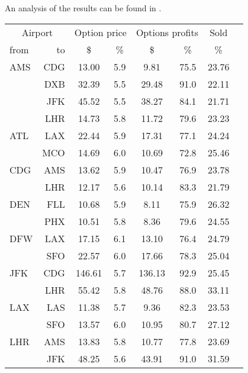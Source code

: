 An analysis of the results can be found in .
\\[2em]
\begin{table}[h]
    \begin{center}
        \begin{tabular}{l r c c c c c c}
            \toprule
            \multicolumn{2}{c}{Airport}  & \multicolumn{2}{c}{Option price} & \multicolumn{2}{c}{Options profits}  &  Sold  \\[.4ex]
            from  &  to  &  \$  & \%  &  \$  & \%  & \%  \\
            \midrule
AMS  &  CDG &   13.00  &     5.9  &    9.81  &    75.5  &   23.76  \\
     &  DXB &   32.39  &     5.5  &   29.48  &    91.0  &   22.11  \\
     &  JFK &   45.52  &     5.5  &   38.27  &    84.1  &   21.71  \\
     &  LHR &   14.73  &     5.8  &   11.72  &    79.6  &   23.23  \\[.5ex]
ATL  &  LAX &   22.44  &     5.9  &   17.31  &    77.1  &   24.24  \\
     &  MCO &   14.69  &     6.0  &   10.69  &    72.8  &   25.46  \\[.5ex]
CDG  &  AMS &   13.62  &     5.9  &   10.47  &    76.9  &   23.78  \\
     &  LHR &   12.17  &     5.6  &   10.14  &    83.3  &   21.79  \\[.5ex]
DEN  &  FLL &   10.68  &     5.9  &    8.11  &    75.9  &   26.32  \\
     &  PHX &   10.51  &     5.8  &    8.36  &    79.6  &   24.55  \\[.5ex]
DFW  &  LAX &   17.15  &     6.1  &   13.10  &    76.4  &   24.79  \\
     &  SFO &   22.57  &     6.0  &   17.66  &    78.3  &   25.04  \\[.5ex]
JFK  &  CDG &  146.61  &     5.7  &  136.13  &    92.9  &   25.45  \\
     &  LHR &   55.42  &     5.8  &   48.76  &    88.0  &   33.11  \\[.5ex]
LAX  &  LAS &   11.38  &     5.7  &    9.36  &    82.3  &   23.53  \\
     &  SFO &   13.57  &     6.0  &   10.95  &    80.7  &   27.12  \\[.5ex]
LHR  &  AMS &   13.83  &     5.8  &   10.77  &    77.8  &   23.69  \\
     &  JFK &   48.25  &     5.6  &   43.91  &    91.0  &   31.59  \\

\end{tabular}
\end{center}
\end{table}
